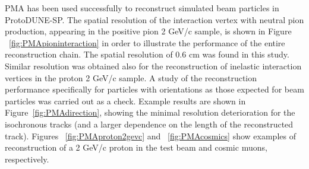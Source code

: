 PMA has been used successfully to reconstruct simulated beam particles in
ProtoDUNE-SP. The spatial resolution of the interaction vertex with neutral pion
production, appearing in the positive pion 2 GeV/c sample, is shown in Figure ~\ref{fig:PMApioninteraction}
in order to illustrate the performance of the entire reconstruction chain. The spatial resolution
of 0.6 cm was found in this study. Similar resolution was obtained also for the reconstruction
of inelastic interaction vertices in the proton 2 GeV/c sample. A study of the reconstruction performance
specifically for particles with orientations as those expected for beam particles was carried out as a check.
Example results are shown in
Figure~\ref{fig:PMAdirection}, showing the minimal resolution deterioration for the isochronous
tracks (and a larger dependence on the length of the reconstructed track). Figures ~\ref{fig:PMAproton2gevc}
and ~\ref{fig:PMAcosmics} show examples of reconstruction of a 2 GeV/c proton in the test beam and
cosmic muons, respectively.




